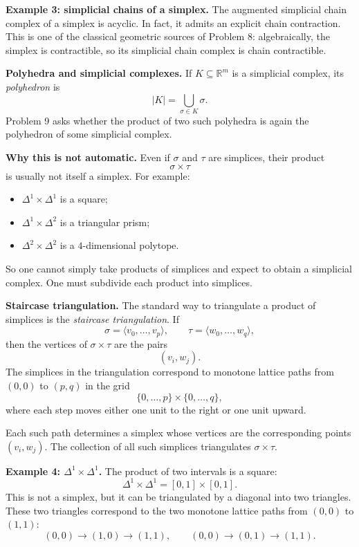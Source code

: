 \documentclass[12pt,a4paper]{article}
\theoremstyle{notespace}
\begin{document}
\medskip

\textbf{Example 3: simplicial chains of a simplex.}
The augmented simplicial chain complex of a simplex is acyclic. In fact, it admits an explicit chain contraction. This is one of the classical geometric sources of Problem 8: algebraically, the simplex is contractible, so its simplicial chain complex is chain contractible.

\bigskip

\textbf{Polyhedra and simplicial complexes.}
If \(K\subseteq \mathbb R^m\) is a simplicial complex, its \emph{polyhedron} is
\[
|K|=\bigcup_{\sigma\in K}\sigma.
\]
Problem 9 asks whether the product of two such polyhedra is again the polyhedron of some simplicial complex.

\medskip

\textbf{Why this is not automatic.}
Even if \(\sigma\) and \(\tau\) are simplices, their product
\[
\sigma\times\tau
\]
is usually not itself a simplex. For example:
\begin{itemize}
	\item \(\Delta^1\times \Delta^1\) is a square;
	\item \(\Delta^1\times \Delta^2\) is a triangular prism;
	\item \(\Delta^2\times \Delta^2\) is a \(4\)-dimensional polytope.
\end{itemize}
So one cannot simply take products of simplices and expect to obtain a simplicial complex. One must subdivide each product into simplices.

\medskip

\textbf{Staircase triangulation.}
The standard way to triangulate a product of simplices is the \emph{staircase triangulation}. If
\[
\sigma=\langle v_0,\dots,v_p\rangle,
\qquad
\tau=\langle w_0,\dots,w_q\rangle,
\]
then the vertices of \(\sigma\times\tau\) are the pairs
\[
(v_i,w_j).
\]
The simplices in the triangulation correspond to monotone lattice paths from \((0,0)\) to \((p,q)\) in the grid
\[
\{0,\dots,p\}\times \{0,\dots,q\},
\]
where each step moves either one unit to the right or one unit upward.

Each such path determines a simplex whose vertices are the corresponding points \((v_i,w_j)\). The collection of all such simplices triangulates \(\sigma\times\tau\).

\medskip

\textbf{Example 4: \(\Delta^1\times \Delta^1\).}
The product of two intervals is a square:
\[
\Delta^1\times \Delta^1=[0,1]\times[0,1].
\]
This is not a simplex, but it can be triangulated by a diagonal into two triangles. These two triangles correspond to the two monotone lattice paths from \((0,0)\) to \((1,1)\):
\[
(0,0)\to (1,0)\to (1,1),
\qquad
(0,0)\to (0,1)\to (1,1).
\]
\end{document}
